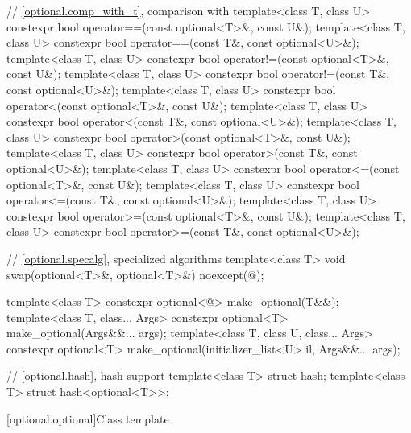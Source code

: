 \begin{codeblock}
{  // \ref{optional.comp_with_t}, comparison with 
  template<class T, class U> constexpr bool operator==(const optional<T>&, const U&);
  template<class T, class U> constexpr bool operator==(const T&, const optional<U>&);
  template<class T, class U> constexpr bool operator!=(const optional<T>&, const U&);
  template<class T, class U> constexpr bool operator!=(const T&, const optional<U>&);
  template<class T, class U> constexpr bool operator<(const optional<T>&, const U&);
  template<class T, class U> constexpr bool operator<(const T&, const optional<U>&);
  template<class T, class U> constexpr bool operator>(const optional<T>&, const U&);
  template<class T, class U> constexpr bool operator>(const T&, const optional<U>&);
  template<class T, class U> constexpr bool operator<=(const optional<T>&, const U&);
  template<class T, class U> constexpr bool operator<=(const T&, const optional<U>&);
  template<class T, class U> constexpr bool operator>=(const optional<T>&, const U&);
  template<class T, class U> constexpr bool operator>=(const T&, const optional<U>&);

  // \ref{optional.specalg}, specialized algorithms
  template<class T>
    void swap(optional<T>&, optional<T>&) noexcept(@\seebelow@);

  template<class T>
    constexpr optional<@\seebelow@> make_optional(T&&);
  template<class T, class... Args>
    constexpr optional<T> make_optional(Args&&... args);
  template<class T, class U, class... Args>
    constexpr optional<T> make_optional(initializer_list<U> il, Args&&... args);

  // \ref{optional.hash}, hash support
  template<class T> struct hash;
  template<class T> struct hash<optional<T>>;
}
\end{codeblock}

[optional.optional]{Class template }

